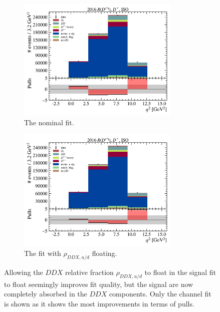 \begin{figure}[!htb]
    \begin{subfigure}[t]{0.5\textwidth}
        \includegraphics[width=0.85\textwidth]{figs-fit/fit_uvsd/fit_result-stacked-Dst-iso-q2.pdf}
        \caption{The nominal fit.}
    \end{subfigure}%
    \begin{subfigure}[t]{0.5\textwidth}
        \includegraphics[width=0.85\textwidth]{figs-fit/fit_uvsd/fit_result-stacked-Dst-iso-q2-floating_uvsd.pdf}
        \caption{The fit with $\rho_{DDX,u/d}$ floating.}
    \end{subfigure}

    \caption{
        Allowing the $DDX$ relative fraction $\rho_{DDX,u/d}$ to float in the
        signal fit to float seemingly improves fit quality,
        but the signal are now completely absorbed in the $DDX$ components.
        Only the \Dstar channel fit is shown as it shows the most improvements
        in terms of pulls.
    }
    \label{fig:fit-float-uvsd}
\end{figure}

